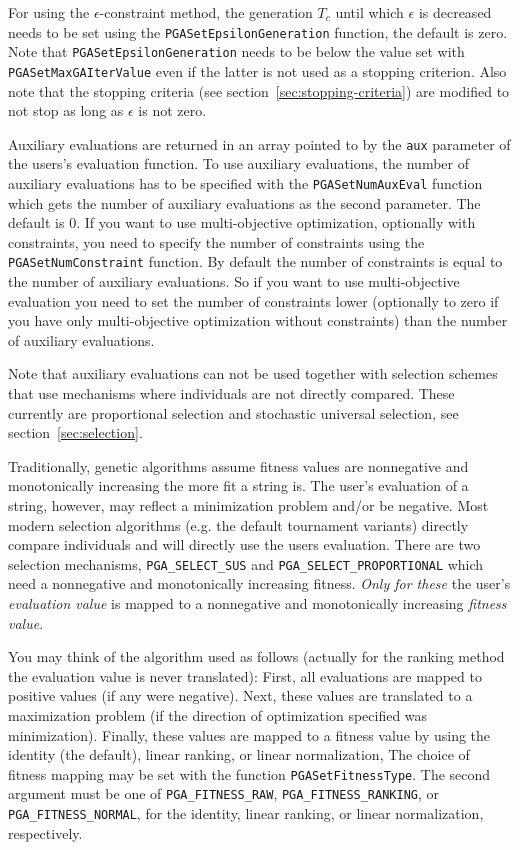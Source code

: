 \documentclass{report}
\begin{document}
For using the $\epsilon$-constraint method, the generation $T_c$ until
which $\epsilon$ is decreased needs to be set using the
\verb+PGASetEpsilonGeneration+ function, the default is zero.
Note that \verb+PGASetEpsilonGeneration+ needs to be below the value set
with \verb+PGASetMaxGAIterValue+ even if the latter is not used as a
stopping criterion. Also note that the stopping criteria (see
section~\ref{sec:stopping-criteria}) are modified to not stop as long as
$\epsilon$ is not zero.

Auxiliary evaluations are returned in an array pointed to by the \verb+aux+
parameter of the users's evaluation function. To use auxiliary
evaluations, the number of auxiliary evaluations has to be specified
with the \verb+PGASetNumAuxEval+ function which gets the number of
auxiliary evaluations as the second parameter. The default is 0.
If you want to use multi-objective optimization, optionally with
constraints, you need to specify the number of constraints using the
\verb+PGASetNumConstraint+ function. By default the number of
constraints is equal to the number of auxiliary evaluations. So if you
want to use multi-objective evaluation you need to set the number of
constraints lower (optionally to zero if you have only multi-objective
optimization without constraints) than the number of auxiliary
evaluations.

Note that auxiliary evaluations can not be used together with selection
schemes that use mechanisms where individuals are not directly compared.
These currently are proportional selection and stochastic universal
selection, see section~\ref{sec:selection}.

Traditionally, genetic algorithms assume fitness values are nonnegative and
monotonically increasing the more fit a string is.  The user's evaluation of a
string, however, may reflect a minimization problem and/or be negative.
Most modern selection algorithms (e.g. the default tournament variants)
directly compare individuals and will directly use the users evaluation.
There are two selection mechanisms, \verb+PGA_SELECT_SUS+ and
\verb+PGA_SELECT_PROPORTIONAL+ which need a nonnegative and
monotonically increasing fitness. \textit{Only for these}
the user's {\em evaluation value} is mapped to a nonnegative and
monotonically increasing {\em fitness value}.

You may think of the algorithm used as follows (actually for the ranking
method the evaluation value is never translated):
First, all evaluations are
mapped to positive values (if any were negative).  Next, these values are
translated to a maximization problem (if the direction of optimization
specified was minimization).  Finally, these values are mapped to a fitness
value by using the identity (the default), linear ranking, or linear
normalization, The choice of fitness mapping may be set with the function
\verb+PGASetFitnessType+.  The second argument must be one of
\verb+PGA_FITNESS_RAW+, \verb+PGA_FITNESS_RANKING+, or
\verb+PGA_FITNESS_NORMAL+, for the identity, linear ranking, or linear
normalization, respectively.
\end{document}
